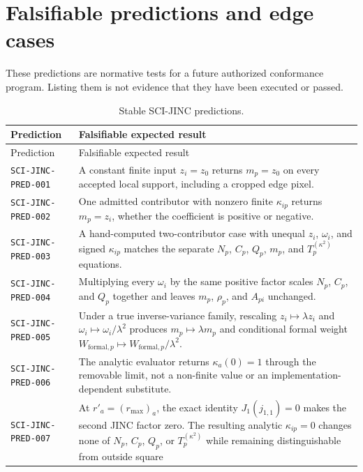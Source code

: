 \section{Falsifiable predictions and edge cases}
\label{sec:predictions}

These predictions are normative tests for a future authorized conformance
program.  Listing them is not evidence that they have been executed or passed.

\begin{longtable}{@{}>{\raggedright\arraybackslash}p{}
                        >{\raggedright\arraybackslash}p{}@{}}
\caption{Stable SCI-JINC predictions.}\label{tab:predictions}\\
\toprule
Prediction & Falsifiable expected result \\
\midrule
\endfirsthead
\toprule
Prediction & Falsifiable expected result \\
\midrule
\endhead
\texttt{SCI-JINC-PRED-001} & A constant finite input $z_i=z_0$ returns
$m_p=z_0$ on every accepted local support, including a cropped edge pixel. \\
\texttt{SCI-JINC-PRED-002} & One admitted contributor with nonzero finite
$\kappa_{ip}$ returns $m_p=z_i$, whether the coefficient is positive or
negative. \\
\texttt{SCI-JINC-PRED-003} & A hand-computed two-contributor case with unequal
$z_i$, $\omega_i$, and signed $\kappa_{ip}$ matches the separate $N_p$, $C_p$,
$Q_p$, $m_p$, and $T_p^{(\kappa^2)}$ equations. \\
\texttt{SCI-JINC-PRED-004} & Multiplying every $\omega_i$ by the same positive
factor scales $N_p$, $C_p$, and $Q_p$ together and leaves $m_p$, $\rho_p$, and
$A_{pi}$ unchanged. \\
\texttt{SCI-JINC-PRED-005} & Under a true inverse-variance family, rescaling
$z_i\mapsto\lambda z_i$ and $\omega_i\mapsto\omega_i/\lambda^2$ produces
$m_p\mapsto\lambda m_p$ and conditional formal weight
$W_{\mathrm{formal},p}\mapsto W_{\mathrm{formal},p}/\lambda^2$. \\
\texttt{SCI-JINC-PRED-006} & The analytic evaluator returns
$\kappa_a(0)=1$ through the removable limit, not a non-finite value or an
implementation-dependent substitute. \\
\texttt{SCI-JINC-PRED-007} & At
$r'_a=(r_{\max})_a$, the exact identity
$J_1(j_{1,1})=0$ makes the second JINC factor zero.  The resulting analytic
$\kappa_{ip}=0$ changes none of $N_p$, $C_p$, $Q_p$, or
$T_p^{(\kappa^2)}$ while remaining distinguishable from outside square

\end{longtable}
